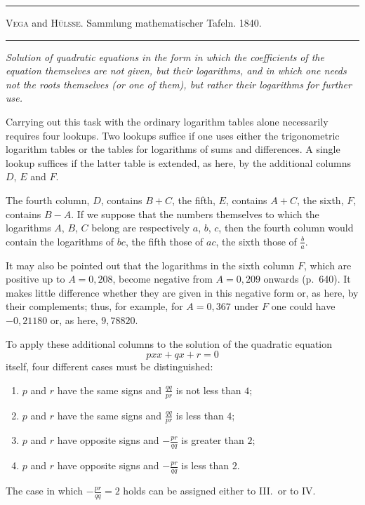 \par{}\begin{center}\rule{0.7\linewidth}{0.4pt}\par \textsc{Vega} and \textsc{Hülsse.} Sammlung mathematischer Tafeln. 1840.\par\rule{0.7\linewidth}{0.4pt}\end{center}

\noindent\textit{Solution of quadratic equations in the form in which the coefficients}
\textit{of the equation themselves are not given, but their logarithms, and in which one needs}
\textit{not the roots themselves (or one of them), but rather their logarithms}
\textit{for further use.}

Carrying out this task with the ordinary logarithm tables alone necessarily requires four lookups. Two lookups suffice if one uses either the trigonometric logarithm tables or the tables for logarithms of sums and  differences. A single lookup suffices if the latter table is extended, as here, by the additional columns $D$, $E$ and $F$.

The fourth column, $D$, contains $B+C$, the fifth, $E$, contains $A+C$,
the sixth, $F$, contains $B-A$. If we suppose that the numbers themselves to which the logarithms $A$, $B$, $C$ belong are respectively $a$, $b$, $c$, then the fourth column would contain the logarithms of $bc$, the fifth those of $ac$, the sixth those of $\frac{b}{a}$.

It may also be pointed out that the logarithms in the sixth column $F$, which are positive up to $A=0{,}208$, become negative from $A=0{,}209$
onwards (p.\ 640). It makes little difference whether they are given in this negative form or, as here, by their complements; thus, for example, for $A=0{,}367$ under $F$ one could have $-0{,}21180$ or, as here, $9{,}78820$.

To apply these additional columns to the solution of the quadratic equation
\[
pxx+qx+r=0
\]
itself, four different cases must be distinguished:
\begin{enumerate}
\item[I.] $p$ and $r$ have the same signs and $\frac{qq}{pr}$ is not less than $4$;
\item[II.] $p$ and $r$ have the same signs and $\frac{qq}{pr}$ is less than $4$;
\item[III.] $p$ and $r$ have opposite signs and $-\frac{pr}{qq}$ is greater than $2$;
\item[IV.] $p$ and $r$ have opposite signs and $-\frac{pr}{qq}$ is less than $2$.
\end{enumerate}
The case in which $-\frac{pr}{qq}=2$ holds can be assigned either to III.\ or to IV.

